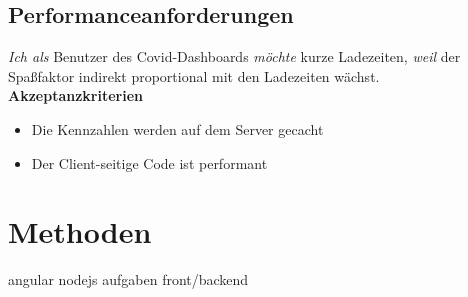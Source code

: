 \documentclass[conference]{IEEEtran}
\begin{document}
\subsection{Performanceanforderungen}
\textit{Ich als} Benutzer des Covid-Dashboards
\textit{möchte} kurze Ladezeiten,
\textit{weil} der Spaßfaktor indirekt proportional mit den Ladezeiten wächst.
\newline
\textbf{Akzeptanzkriterien}
\begin{itemize}
    \item Die Kennzahlen werden auf dem Server gecacht
    \item Der Client-seitige Code ist performant
\end{itemize}

\section{Methoden}
angular
nodejs
aufgaben front/backend
\end{document}
